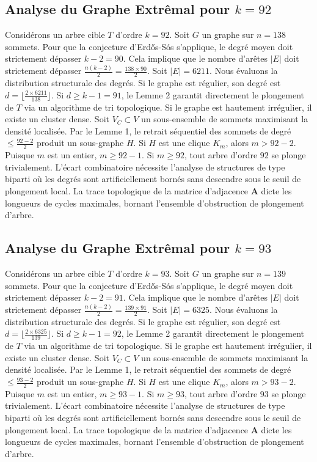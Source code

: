 \documentclass[11pt,a4paper]{article}
\begin{document}
\subsection{Analyse du Graphe Extr\^emal pour $k=92$}
Consid\'erons un arbre cible $T$ d'ordre $k=92$.
Soit $G$ un graphe sur $n=138$ sommets.
Pour que la conjecture d'Erd\H{o}s-S\'os s'applique, le degr\'e moyen doit strictement d\'epasser $k-2 = 90$.
Cela implique que le nombre d'ar\^etes $|E|$ doit strictement d\'epasser $\frac{n(k-2)}{2} = \frac{138 \times 90}{2}$.
Soit $|E| = 6211$.
Nous \'evaluons la distribution structurale des degr\'es. Si le graphe est r\'egulier, son degr\'e est $d = \lfloor \frac{2 \times 6211}{138} \rfloor$.
Si $d \geq k-1 = 91$, le Lemme 2 garantit directement le plongement de $T$ via un algorithme de tri topologique.
Si le graphe est hautement irr\'egulier, il existe un cluster dense. Soit $V_C \subset V$ un sous-ensemble de sommets maximisant la densit\'e localis\'ee.
Par le Lemme 1, le retrait s\'equentiel des sommets de degr\'e $\leq \frac{92-2}{2}$ produit un sous-graphe $H$.
Si $H$ est une clique $K_{m}$, alors $m > 92-2$. Puisque $m$ est un entier, $m \geq 92-1$. Si $m \geq 92$, tout arbre d'ordre $92$ se plonge trivialement.
L'\'ecart combinatoire n\'ecessite l'analyse de structures de type biparti o\`u les degr\'es sont artificiellement born\'es sans descendre sous le seuil de plongement local. La trace topologique de la matrice d'adjacence $\mathbf{A}$ dicte les longueurs de cycles maximales, bornant l'ensemble d'obstruction de plongement d'arbre.


\subsection{Analyse du Graphe Extr\^emal pour $k=93$}
Consid\'erons un arbre cible $T$ d'ordre $k=93$.
Soit $G$ un graphe sur $n=139$ sommets.
Pour que la conjecture d'Erd\H{o}s-S\'os s'applique, le degr\'e moyen doit strictement d\'epasser $k-2 = 91$.
Cela implique que le nombre d'ar\^etes $|E|$ doit strictement d\'epasser $\frac{n(k-2)}{2} = \frac{139 \times 91}{2}$.
Soit $|E| = 6325$.
Nous \'evaluons la distribution structurale des degr\'es. Si le graphe est r\'egulier, son degr\'e est $d = \lfloor \frac{2 \times 6325}{139} \rfloor$.
Si $d \geq k-1 = 92$, le Lemme 2 garantit directement le plongement de $T$ via un algorithme de tri topologique.
Si le graphe est hautement irr\'egulier, il existe un cluster dense. Soit $V_C \subset V$ un sous-ensemble de sommets maximisant la densit\'e localis\'ee.
Par le Lemme 1, le retrait s\'equentiel des sommets de degr\'e $\leq \frac{93-2}{2}$ produit un sous-graphe $H$.
Si $H$ est une clique $K_{m}$, alors $m > 93-2$. Puisque $m$ est un entier, $m \geq 93-1$. Si $m \geq 93$, tout arbre d'ordre $93$ se plonge trivialement.
L'\'ecart combinatoire n\'ecessite l'analyse de structures de type biparti o\`u les degr\'es sont artificiellement born\'es sans descendre sous le seuil de plongement local. La trace topologique de la matrice d'adjacence $\mathbf{A}$ dicte les longueurs de cycles maximales, bornant l'ensemble d'obstruction de plongement d'arbre.
\end{document}
